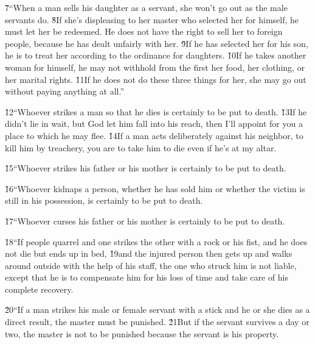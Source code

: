 \v{7}``When a man sells his daughter as a servant, she won't go out as the male servants do. \v{8}If she's displeasing to her master who selected her for himself, he must let her be redeemed. He does not have the right to sell her to foreign people, because he has dealt unfairly with her. \v{9}If he has selected her for his son, he is to treat her according to the ordinance for daughters. \v{10}If he takes another woman for himself, he may not withhold from the first her food, her clothing, or her marital rights. \v{11}If he does not do these three things for her, she may go out without paying anything at all.''

\v{12}``Whoever strikes a man so that he dies is certainly to be put to death. \v{13}If he didn't lie in wait, but God let him fall into his reach, then I'll appoint for you a place to which he may flee. \v{14}If a man acts deliberately against his neighbor, to kill him by treachery, you are to take him to die even if he's at my altar.

\v{15}``Whoever strikes his father or his mother is certainly to be put to death.

\v{16}``Whoever kidnaps a person, whether he has sold him or whether the victim is still in his possession, is certainly to be put to death.

\v{17}``Whoever curses his father or his mother is certainly to be put to death.

\v{18}``If people quarrel and one strikes the other with a rock or his fist, and he does not die but ends up in bed, \v{19}and the injured person then gets up and walks around outside with the help of his staff, the one who struck him is not liable, except that he is to compensate him for his loss of time and take care of his complete recovery.

\v{20}``If a man strikes his male or female servant with a stick and he or she dies as a direct result, the master must be punished. \v{21}But if the servant survives a day or two, the master is not to be punished because the servant is his property.

